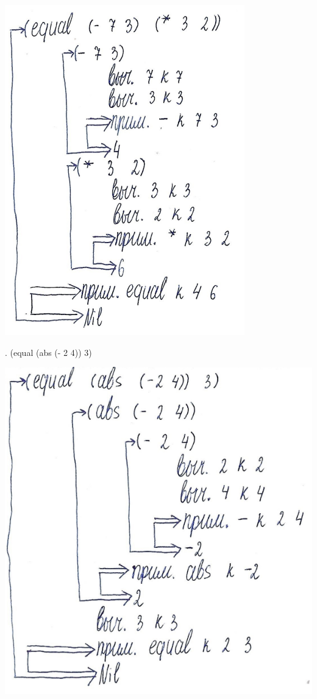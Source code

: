 \documentclass[12pt]{report}
\begin{document}
\includegraphics[scale=1]{img/1.5}

. (equal (abs (- 2 4)) 3)

\includegraphics[scale=1]{img/1.6}
\end{document}
